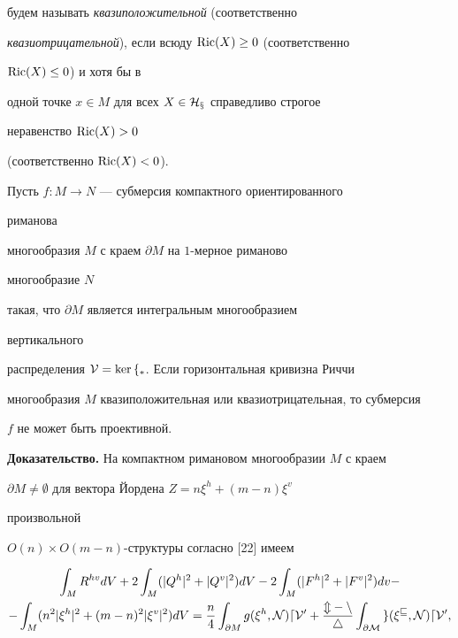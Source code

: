 будем называть {\it квазиположительной} (соответственно 


{\it квазиотрицательной}), если всюду $\operatorname{Ric}(X)\ge 0$ (соответственно 


$\operatorname{Ric}(X)\le 0$) и хотя бы в 


одной точке $x\in M$ для всех $X\in\cal H_x$ справедливо строгое 


неравенство $\operatorname{Ric}(X)>0$ 


(соответственно $\operatorname{Ric}(X)<0$). 


 


\begin{thm} Пусть $f:M\to N$ --- субмерсия компактного ориентированного 


риманова 


многообразия $M$ с краем $\partial M$ на $1$-мерное риманово 


многообразие $N$ 


такая, что $\partial M$ является интегральным многообразием 


вертикального 


распределения $\cal V=\ker f_*$. Если горизонтальная кривизна Риччи 


многообразия $M$ квазиположительная или квазиотрицательная, то субмерсия


$f$ не может быть проективной. 


\end{thm} 


 


{\bf Доказательство.} На компактном римановом многообразии $M$ с краем 


$\partial M\ne\emptyset$ для вектора Йордена $Z=n\xi^h+(m-n)\xi^v$ 


произвольной 


$O(n)\times O(m-n)$-структуры согласно [22] имеем 


\begin{multline} 


\int_M R^{hv}dV+2\int_M(|Q^h|^2+|Q^v|^2)dV- 


2\int_M(|F^h|^2+|F^v|^2)dv - \\ 


% 


-\int_M(n^2|\xi^h|^2+(m-n)^2|\xi^v|^2)dV=\frac{n}{4} 


\int_{\partial M}g(\xi^h,\cal N)dV'+\frac{m-n}{4} 


\int_{\partial M}g(\xi^v,\cal N)dV', 


\end{multline} 


